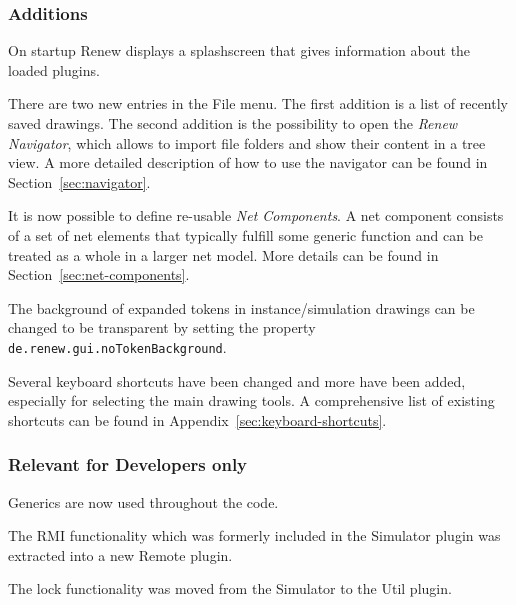 \subsubsection*{Additions}

On startup Renew displays a splashscreen that gives information about
the loaded plugins.

There are two new entries in the File menu. The first addition is a
list of recently saved drawings. The second addition is the
possibility to open the \emph{Renew Navigator}, which allows to import
file folders and show their content in a tree view. A more detailed
description of how to use the navigator can be found in
Section~\ref{sec:navigator}.

It is now possible to define re-usable \emph{Net Components}. A net
component consists of a set of net elements that typically fulfill
some generic function and can be treated as a whole in a larger net
model. More details can be found in Section~\ref{sec:net-components}.

The background of expanded tokens in instance/simulation
drawings can be changed to be transparent by setting the property 
\texttt{de.\allowbreak{}renew.\allowbreak{}gui.\allowbreak{}no\allowbreak{}Token\allowbreak{}Background}.

Several keyboard shortcuts have been changed and more have been
added, especially for selecting the main drawing tools. A
comprehensive list of existing shortcuts can be found in
Appendix~\ref{sec:keyboard-shortcuts}.

\subsubsection*{Relevant for Developers only}

Generics are now used throughout the code.

The RMI functionality which was formerly included in the Simulator
plugin was extracted into a new Remote plugin.

The lock functionality was moved from the Simulator to the Util
plugin.


